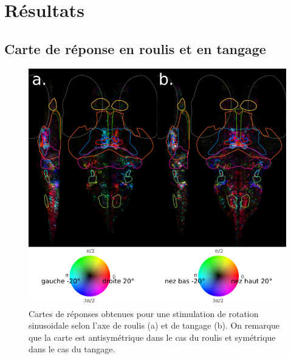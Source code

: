 

\section{Résultats}


\subsection{Carte de réponse en roulis et en tangage}


\begin{figure}
\centering
\includegraphics[width=1\textwidth]{./files/tilt_roll.svg.png}
\caption{Cartes de réponses obtenues pour une stimulation de rotation sinusoidale selon l'axe de roulis (a) et de tangage (b). On remarque que la carte est antisymétrique dans le cas du roulis et symétrique dans le cas du tangage.
}
\end{figure}
    
